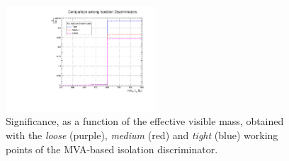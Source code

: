  \begin{tiny} 
 \begin{table}[ht] 
 \caption{Signal and background yields obtained using the \textit{tight}, \textit{medium} and \textit{loose} WPs for the MVA-based 
 isolation discriminator. The significance was estimated in the region where the signal is expected. 
  (\mass~$>~$600\GeV). \label{tab:isoappendix} }
 \end{table} 
 \end{tiny} 

\begin{figure}[ht]
\begin{center}
\captionsetup[subfloat]{farskip=0pt,captionskip=0.0cm,labelformat=empty}
\includegraphics[clip,width=0.5\textwidth]{figuras/AppendiceB/IsoDiscr/IsoDiscrComparison.pdf}
 \caption{Significance, as a function of the effective visible mass, obtained 
 with the \textit{loose} (purple),  \textit{medium} (red) and \textit{tight} (blue) working points of the MVA-based isolation discriminator. \label{fig:isoappendix}}
\end{center}
\end{figure}
\vspace{-1.0cm}

